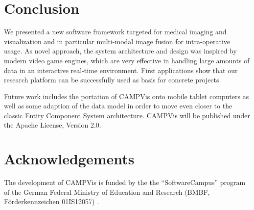 \section{Conclusion}

We presented a new software framework targeted for medical imaging and visualization and in particular multi-modal image fusion for intra-operative usage.
As novel approach, the system architecture and design was inspired by modern video game engines, which are very effective in handling large amounts of data in an interactive real-time environment.
First applications show that our research platform can be successfully used as basis for concrete projects.

Future work includes the portation of CAMPVis onto mobile tablet computers as well as some adaption of the data model in order to move even closer to the classic Entity Component System architecture.
CAMPVis will be published under the Apache License, Version 2.0. 


\section*{Acknowledgements}
The development of CAMPVis is funded by the the ``SoftwareCampus'' program of the German Federal Ministry of Education and Research (BMBF, F\"orderkennzeichen 01IS12057) .



